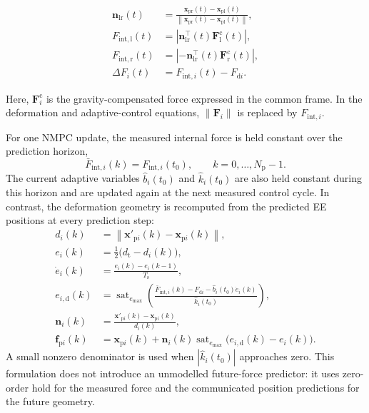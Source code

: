 \begin{align}
\boldsymbol{n}_{\mathrm{lr}}(t)
&=
\frac{\boldsymbol{x}_{\mathrm{pr}}(t)
-\boldsymbol{x}_{\mathrm{pl}}(t)}
{\left\|\boldsymbol{x}_{\mathrm{pr}}(t)
-\boldsymbol{x}_{\mathrm{pl}}(t)\right\|},\\
F_{\mathrm{int},\mathrm l}(t)
&=
\left|
\boldsymbol{n}_{\mathrm{lr}}^{\top}(t)
\boldsymbol{F}_{\mathrm l}^{\mathrm c}(t)
\right|,\\
F_{\mathrm{int},\mathrm r}(t)
&=
\left|
-\boldsymbol{n}_{\mathrm{lr}}^{\top}(t)
\boldsymbol{F}_{\mathrm r}^{\mathrm c}(t)
\right|,\\
\Delta F_i(t)&=F_{\mathrm{int},i}(t)-F_{\mathrm d i}.
\label{eq:projected_internal_force}
\end{align}

Here, $\boldsymbol{F}_{i}^{\mathrm c}$ is the gravity-compensated force
expressed in the common frame. In the deformation and adaptive-control
equations, $\|\boldsymbol{F}_i\|$ is replaced by
$F_{\mathrm{int},i}$.


For one NMPC update, the measured internal force is held constant over the
prediction horizon,
\begin{equation}
\bar F_{\mathrm{int},i}(k)=F_{\mathrm{int},i}(t_0),
\qquad k=0,\ldots,N_{\mathrm p}-1.
\end{equation}
The current adaptive variables $\hat b_i(t_0)$ and $\hat k_i(t_0)$ are also
held constant during this horizon and are updated again at the next measured
control cycle. In contrast, the deformation geometry is recomputed from the
predicted EE positions at every prediction step:
\begin{align}
d_i(k)
&=\left\|
\boldsymbol{x}'_{\mathrm p i}(k)
-\boldsymbol{x}_{\mathrm p i}(k)
\right\|,\\
e_i(k)&=\frac{1}{2}\bigl(d_{\mathrm t}-d_i(k)\bigr),\\
\dot e_i(k)&=\frac{e_i(k)-e_i(k-1)}{T_{\mathrm s}},\\
e_{i,\mathrm d}(k)
&=\operatorname{sat}_{e_{\max}}
\left(
\frac{
\bar F_{\mathrm{int},i}(k)-F_{\mathrm d i}
-\hat b_i(t_0)\dot e_i(k)}
{\hat k_i(t_0)}
\right),\\
\boldsymbol{n}_i(k)
&=\frac{
\boldsymbol{x}'_{\mathrm p i}(k)
-\boldsymbol{x}_{\mathrm p i}(k)}
{d_i(k)},\\
\boldsymbol{f}_{\mathrm p i}(k)
&=\boldsymbol{x}_{\mathrm p i}(k)
+\boldsymbol{n}_i(k)
\operatorname{sat}_{e_{\max}}
\bigl(e_{i,\mathrm d}(k)-e_i(k)\bigr).
\label{eq:aic_horizon_geometry}
\end{align}
A small nonzero denominator is used when
$|\hat k_i(t_0)|$ approaches zero. This formulation does not introduce an
unmodelled future-force predictor: it uses zero-order hold for the measured
force and the communicated position predictions for the future geometry.

